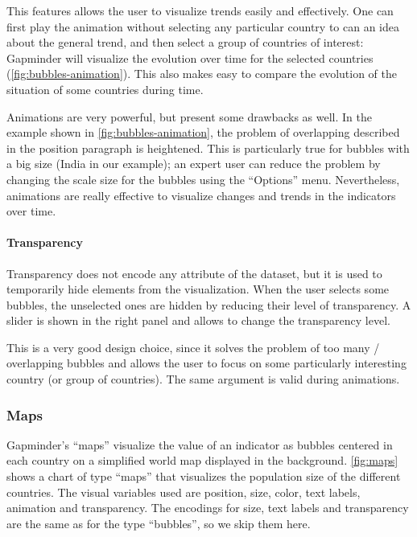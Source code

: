 This features allows the user to visualize trends easily and effectively.
One can first play the animation without selecting any particular country to can an idea about the general trend, and then select a group of countries of interest:
Gapminder will visualize the evolution over time for the selected countries (\cref{fig:bubbles-animation}).
This also makes easy to compare the evolution of the situation of some countries during time.

Animations are very powerful, but present some drawbacks as well.
In the example shown in \cref{fig:bubbles-animation}, the problem of overlapping described in the position paragraph is heightened.
This is particularly true for bubbles with a big size (India in our example);
an expert user can reduce the problem by changing the scale size for the bubbles using the ``Options'' menu.
Nevertheless, animations are really effective to visualize changes and trends in the indicators over time.

\paragraph{Transparency}
Transparency does not encode any attribute of the dataset, but it is used to temporarily hide elements from the visualization.
When the user selects some bubbles, the unselected ones are hidden by reducing their level of transparency.
A slider is shown in the right panel and allows to change the transparency level.

This is a very good design choice, since it solves the problem of too many / overlapping bubbles and allows the user to focus on some particularly interesting country (or group of countries).
The same argument is valid during animations.


\subsubsection{Maps}
Gapminder's ``maps'' visualize the value of an indicator as bubbles centered in each country on a simplified world map displayed in the background.
\cref{fig:maps} shows a chart of type ``maps'' that visualizes the population size of the different countries.
The visual variables used are position, size, color, text labels, animation and transparency.
The encodings for size, text labels and transparency are the same as for the type ``bubbles'', so we skip them here.

